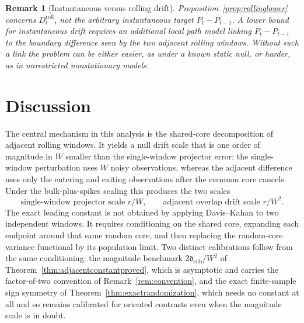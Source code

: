 \documentclass[11pt]{article}
\theoremstyle{tightplain}
\theoremstyle{tightdef}
\newtheorem{remark}[theorem]{Remark}
\begin{document}
\begin{remark}[Instantaneous versus rolling drift]\label{rem:instantaneousvsrolling}
Proposition~\ref{prop:rollinglower} concerns $D_t^{\mathrm{roll}}$, not the
arbitrary instantaneous target $P_t-P_{t-1}$. A lower bound for instantaneous
drift requires an additional local path model linking $P_t-P_{t-1}$ to the
boundary difference seen by the two adjacent rolling windows. Without such a
link the problem can be either easier, as under a known static null, or harder,
as in unrestricted nonstationary models.
\end{remark}

\section{Discussion}

The central mechanism in this analysis is the shared-core decomposition of
adjacent rolling windows. It yields a null drift scale that is one order of
magnitude in $W$ smaller than the single-window projector error: the
single-window perturbation uses $W$ noisy observations, whereas the adjacent
difference uses only the entering and exiting observations after the common
core cancels. Under the bulk-plus-spikes scaling this produces the two scales
\[
\text{single-window projector scale } r/W,
\qquad
\text{adjacent overlap drift scale } r/W^2.
\]
The exact leading constant is not obtained by applying Davis--Kahan
\cite{DavisKahan1970} to two independent windows. It requires conditioning on
the shared core, expanding each endpoint around that same random core, and then
replacing the random-core variance functional by its population limit. Two
distinct calibrations follow from the same conditioning: the magnitude
benchmark $2\mathfrak d_{\mathrm{sub}}/W^2$ of
Theorem~\ref{thm:adjacentconstantproved}, which is asymptotic and carries the
factor-of-two convention of Remark~\ref{rem:convention}, and the exact
finite-sample sign symmetry of Theorem~\ref{thm:exactrandomization}, which
needs no constant at all and so remains calibrated for oriented contrasts even
when the magnitude scale is in doubt.
\end{document}
